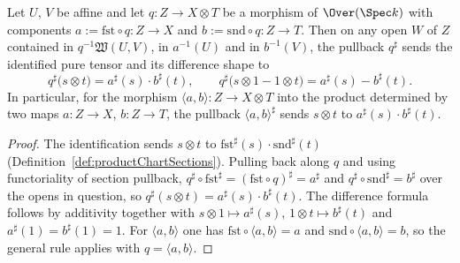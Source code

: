 \begin{theorem}
  \label{thm:appLE_productChartSections}
  \leanok
  Let \(U\), \(V\) be affine and let \(q \colon Z \to X \otimes T\) be a morphism of
  \(\Over(\Spec k)\) with components \(a := \mathrm{fst} \circ q \colon Z \to X\) and
  \(b := \mathrm{snd} \circ q \colon Z \to T\). Then on any open \(W\) of \(Z\) contained in
  \(q^{-1}\mathfrak W(U,V)\), in \(a^{-1}(U)\) and in \(b^{-1}(V)\), the pullback \(q^\sharp\)
  sends the identified pure tensor and its difference shape to
  \[
    q^\sharp\bigl(s \otimes t\bigr) = a^\sharp(s) \cdot b^\sharp(t), \qquad
    q^\sharp\bigl(s \otimes 1 - 1 \otimes t\bigr) = a^\sharp(s) - b^\sharp(t).
  \]
  In particular, for the morphism \(\langle a, b\rangle \colon Z \to X \otimes T\) into the
  product determined by two maps \(a \colon Z \to X\), \(b \colon Z \to T\), the pullback
  \(\langle a, b\rangle^\sharp\) sends \(s \otimes t\) to \(a^\sharp(s) \cdot b^\sharp(t)\).
\end{theorem}
\begin{proof}
  \leanok
  The identification sends \(s \otimes t\) to
  \(\mathrm{fst}^\sharp(s) \cdot \mathrm{snd}^\sharp(t)\)
  (Definition~\ref{def:productChartSections}). Pulling back along \(q\) and using functoriality
  of section pullback, \(q^\sharp \circ \mathrm{fst}^\sharp = (\mathrm{fst} \circ q)^\sharp = a^\sharp\)
  and \(q^\sharp \circ \mathrm{snd}^\sharp = b^\sharp\) over the opens in question, so
  \(q^\sharp(s \otimes t) = a^\sharp(s) \cdot b^\sharp(t)\). The difference formula follows by
  additivity together with \(s \otimes 1 \mapsto a^\sharp(s)\), \(1 \otimes t \mapsto b^\sharp(t)\)
  and \(a^\sharp(1) = b^\sharp(1) = 1\). For \(\langle a,b\rangle\) one has
  \(\mathrm{fst} \circ \langle a,b\rangle = a\) and \(\mathrm{snd} \circ \langle a,b\rangle = b\),
  so the general rule applies with \(q = \langle a, b\rangle\).
\end{proof}

